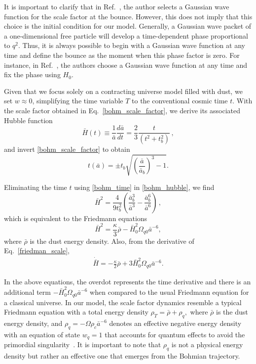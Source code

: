 \documentclass[a4paper,11pt]{article}
\newcommand{\dpar}[1]{\left(#1 \right)}
\begin{document}
It is important to clarify that in Ref.~\cite{nelson2021bouncing}, the author selects a
Gaussian wave function for the scale factor at the bounce. However, this does not imply
that this choice is the initial condition for our model. Generally, a Gaussian wave
packet of a one-dimensional free particle will develop a time-dependent phase
proportional to $q^2$. Thus, it is always possible to begin with a Gaussian wave
function at any time and define the bounce as the moment when this phase factor is zero.
For instance, in Ref.~\cite{Peter2016a}, the authors choose a Gaussian wave function at
any time and fix the phase using $H_0$.

Given that we focus solely on a contracting universe model filled with dust, we set $w
	\approx 0$, simplifying the time variable $T$ to the conventional cosmic time $t$. With
the scale factor obtained in Eq.~\eqref{bohm_scale_factor}, we derive its associated
Hubble function
\begin{equation}\label{bohm_hubble}
	\bar{H}(t) \equiv \frac{1}{\bar{a}}\frac{d\bar{a}}{dt} = \frac{2}{3}\frac{t}{ \dpar{ t^{2} + t^{2}_{b} } }\, ,
\end{equation}
and invert \eqref{bohm_scale_factor} to obtain
\begin{equation}\label{bohm_time}
	t(\bar{a}) = \pm t_{b}\sqrt{ \dpar{\frac{\bar{a}}{\bar{a}_{b}}}^{3} - 1 } .
\end{equation}

Eliminating the time $t$ using \eqref{bohm_time} in \eqref{bohm_hubble}, we find
\begin{equation}
	\label{friedman_scale}
	\bar{H}^{2} = \frac{ 4 }{ 9t^{2}_{b}}\dpar
	{ \frac{ \bar{a}^{3}_{b} }{ \bar{a}^{3} } - \frac{\bar{a}_{b}^{6}}{ \bar{a}^{6} } }\, ,
\end{equation}
which is equivalent to the Friedmann equations
\begin{equation}\label{effective_friedmann}
	\bar{H}^{2} = \frac{\kappa}{ 3 }\bar\rho - \bar{H}^{2}_{0}\Omega_{q0}\bar{a}^{-6},
\end{equation}
where $\bar\rho$ is the dust energy density. Also, from the derivative of
Eq.~\eqref{friedman_scale},
\begin{align}\label{effective_friedmann2}
	\dot{\bar{H}} = - \frac{\kappa}{2} \bar\rho + 3\bar{H}^{2}_{0}\Omega_{q0}\bar{a}^{-6}.
\end{align}

In the above equations, the overdot represents the time derivative and there is an
additional term $-\bar{H}^{2}_{0}\Omega_{q0}\bar{a}^{-6}$ when compared to the usual
Friedmann equation for a classical universe. In our model, the scale factor dynamics
resemble a typical Friedmann equation with a total energy density $\rho_{T} = \bar{\rho}
	+ \rho_{q},$ where $\bar{\rho}$ is the dust energy density, and $\rho_{q} = -\Omega
	\rho_{c} \bar{a}^{-6}$ denotes an effective negative energy density with an equation of
state $w_q = 1$ that accounts for quantum effects to avoid the primordial
singularity~\cite{vitenti2012large}. It is important to note that $\rho_{q}$ is not a
physical energy density but rather an effective one that emerges from the Bohmian
trajectory.
\end{document}
